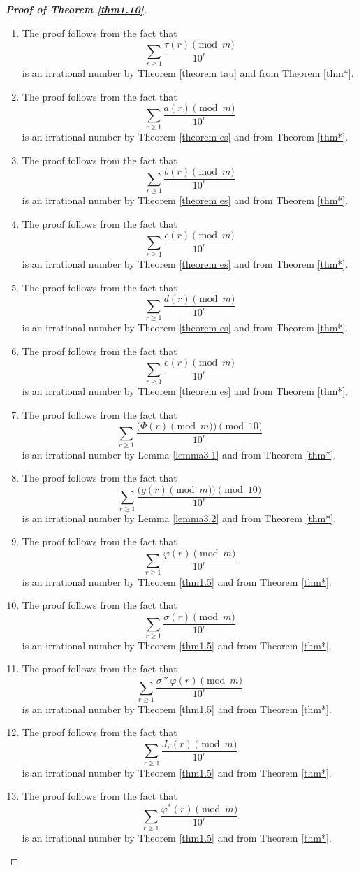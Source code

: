 \documentclass[12pt,reqno]{amsart}
\begin{document}
\begin{proof}[\textbf{Proof of Theorem \ref{thm1.10}}]


\noindent
\begin{enumerate}
 \item The proof follows from the fact that  
$$\sum_{r\geq1}\frac{\tau(r)\pmod{m}}{10^r}$$
is an irrational number by Theorem \ref{theorem tau} and from Theorem \ref{thm*}.
 \item The proof follows from the fact that  
$$\sum_{r\geq1}\frac{a(r)\pmod{m}}{10^r}$$
is an irrational number by Theorem \ref{theorem es} and from Theorem \ref{thm*}.
\item The proof follows from the fact that  
$$\sum_{r\geq1}\frac{b(r)\pmod{m}}{10^r}$$
is an irrational number by Theorem \ref{theorem es} and from Theorem \ref{thm*}.
\item The proof follows from the fact that  
$$\sum_{r\geq1}\frac{c(r)\pmod{m}}{10^r}$$
is an irrational number by Theorem \ref{theorem es} and from Theorem \ref{thm*}.
\item The proof follows from the fact that  
$$\sum_{r\geq1}\frac{d(r)\pmod{m}}{10^r}$$
is an irrational number by Theorem \ref{theorem es} and from Theorem \ref{thm*}.
\item The proof follows from the fact that  
$$\sum_{r\geq1}\frac{e(r)\pmod{m}}{10^r}$$
is an irrational number by Theorem \ref{theorem es} and from Theorem \ref{thm*}.
 \item  The proof follows from the fact that  
 $$\sum_{r\geq1}\frac{\big(\Phi(r)\pmod{m}\big)\pmod{10}}{10^r}$$
 is an irrational number by Lemma \ref{lemma3.1} and from Theorem \ref{thm*}. 
 \item  The proof follows from the fact that  
 $$\sum_{r\geq1}\frac{\big(g(r)\pmod{m}\big)\pmod{10}}{10^r}$$
 is an irrational number by Lemma \ref{lemma3.2} and from Theorem \ref{thm*}. 
 \item The proof follows from the fact that  
$$\sum_{r\geq1}\frac{\varphi(r)\pmod{m}}{10^r}$$
is an irrational number by Theorem \ref{thm1.5} and from Theorem \ref{thm*}.
 \item The proof follows from the fact that  
$$\sum_{r\geq1}\frac{\sigma(r)\pmod{m}}{10^r}$$
is an irrational number by Theorem \ref{thm1.5} and from Theorem \ref{thm*}.
 \item The proof follows from the fact that  
$$\sum_{r\geq1}\frac{\sigma*\varphi(r)\pmod{m}}{10^r}$$
is an irrational number by Theorem \ref{thm1.5} and from Theorem \ref{thm*}.
 \item The proof follows from the fact that  
$$\sum_{r\geq1}\frac{J_v(r)\pmod{m}}{10^r}$$
is an irrational number by Theorem \ref{thm1.5} and from Theorem \ref{thm*}.
 \item The proof follows from the fact that  
$$\sum_{r\geq1}\frac{\varphi^{*}(r)\pmod{m}}{10^r}$$
is an irrational number by Theorem \ref{thm1.5} and from Theorem \ref{thm*}.

\end{enumerate}
\end{proof}
\end{document}
